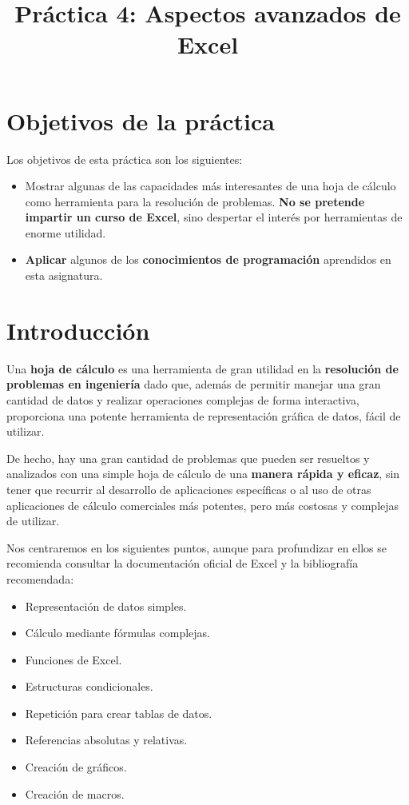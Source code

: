 \documentclass[
  spanish,
  11pt,
  a4paper,
  DIV=11,
  numbers=noendperiod]{scrartcl}
\title{Práctica 4: Aspectos avanzados de Excel}
\author{}
\date{}
\providecommand{\tightlist}{\setlength{\itemsep}{0pt}\setlength{\parskip}{0pt}}
\begin{document}
\maketitle

\renewcommand*\contentsname{Tabla de contenidos}
{
\hypersetup{linkcolor=}
\setcounter{tocdepth}{2}
\tableofcontents
}

\clearpage

\section{Objetivos de la práctica}
\label{objetivos-de-la-practica}

Los objetivos de esta práctica son los siguientes:

\begin{itemize}
\tightlist
\item Mostrar algunas de las capacidades más interesantes de una hoja de cálculo como herramienta para la resolución de problemas. \textbf{No se pretende impartir un curso de Excel}, sino despertar el interés por herramientas de enorme utilidad.
\item \textbf{Aplicar} algunos de los \textbf{conocimientos de programación} aprendidos en esta asignatura.
\end{itemize}

\section{Introducción}
\label{introduccion}

Una \textbf{hoja de cálculo} es una herramienta de gran utilidad en la \textbf{resolución de problemas en ingeniería} dado que, además de permitir manejar una gran cantidad de datos y realizar operaciones complejas de forma interactiva, proporciona una potente herramienta de representación gráfica de datos, fácil de utilizar.

De hecho, hay una gran cantidad de problemas que pueden ser resueltos y analizados con una simple hoja de cálculo de una \textbf{manera rápida y eficaz}, sin tener que recurrir al desarrollo de aplicaciones específicas o al uso de otras aplicaciones de cálculo comerciales más potentes, pero más costosas y complejas de utilizar.

Nos centraremos en los siguientes puntos, aunque para profundizar en ellos se recomienda consultar la documentación oficial de Excel y la bibliografía recomendada:

\begin{itemize}
\tightlist
\item Representación de datos simples.
\item Cálculo mediante fórmulas complejas.
\item Funciones de Excel.
\item Estructuras condicionales.
\item Repetición para crear tablas de datos.
\item Referencias absolutas y relativas.
\item Creación de gráficos.
\item Creación de macros.
\end{itemize}
\end{document}
